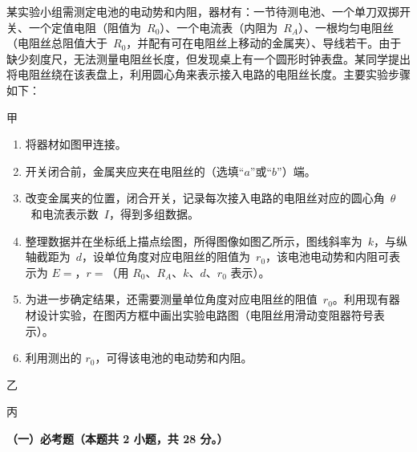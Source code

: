 \begin{question}
某实验小组需测定电池的电动势和内阻，器材有：一节待测电池、一个单刀双掷开关、一个定值电阻（阻值为~$R_{0}$）、一个电流表（内阻为~$R_{A}$）、一根均匀电阻丝（电阻丝总阻值大于~$R_{0}$，并配有可在电阻丝上移动的金属夹）、导线若干。由于缺少刻度尺，无法测量电阻丝长度，但发现桌上有一个圆形时钟表盘。某同学提出将电阻丝绕在该表盘上，利用圆心角来表示接入电路的电阻丝长度。主要实验步骤如下：


甲

\begin{enumerate}[leftmargin=2em]
  \item 将器材如图甲连接。
  \item 开关闭合前，金属夹应夹在电阻丝的\gkblank（选填``$a$''或``$b$''）端。
  \item 改变金属夹的位置，闭合开关，记录每次接入电路的电阻丝对应的圆心角~$\theta$~和电流表示数~$I$，得到多组数据。
  \item 整理数据并在坐标纸上描点绘图，所得图像如图乙所示，图线斜率为~$k$，与纵轴截距为~$d$，设单位角度对应电阻丝的阻值为~$r_{0}$，该电池电动势和内阻可表示为 $E=$\gkblank，$r=$\gkblank（用 $R_{0}$、$R_{A}$、$k$、$d$、$r_{0}$ 表示）。
  \item 为进一步确定结果，还需要测量单位角度对应电阻丝的阻值~$r_{0}$。利用现有器材设计实验，在图丙方框中画出实验电路图（电阻丝用滑动变阻器符号表示）。
  \item 利用测出的 $r_{0}$，可得该电池的电动势和内阻。
\end{enumerate}


乙


丙
\end{question}


\textbf{（一）必考题（本题共 2 小题，共 28 分。）}


